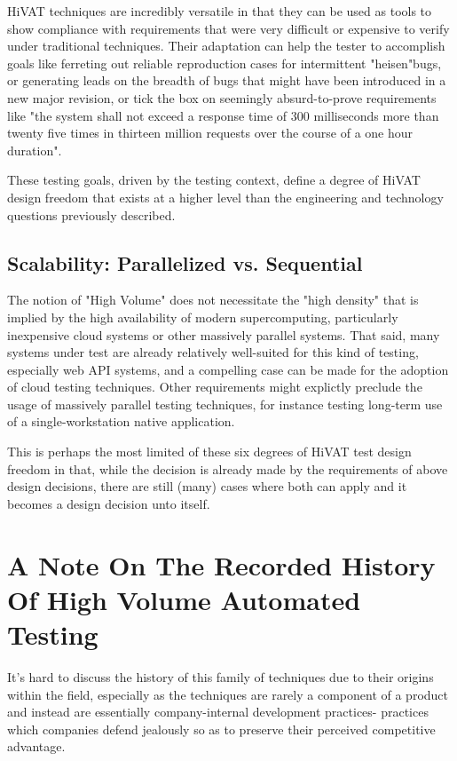 HiVAT techniques are incredibly versatile in that they can be used as tools to show compliance with requirements that were very difficult or expensive to verify under traditional techniques. Their adaptation can help the tester to accomplish goals like ferreting out reliable reproduction cases for intermittent "heisen"bugs, or generating leads on the breadth of bugs that might have been introduced in a new major revision, or tick the box on seemingly absurd-to-prove requirements like "the system shall not exceed a response time of 300 milliseconds more than twenty five times in thirteen million requests over the course of a one hour duration".

These testing goals, driven by the testing context, define a degree of HiVAT design freedom that exists at a higher level than the engineering and technology questions previously described.

\subsection{Scalability: Parallelized vs. Sequential}
The notion of "High Volume" does not necessitate the "high density" that is implied by the high availability of modern supercomputing, particularly inexpensive cloud systems or other massively parallel systems. That said, many systems under test are already relatively well-suited for this kind of testing, especially web API systems, and a compelling case can be made for the adoption of cloud testing techniques.\citep{parveen2010migrate} Other requirements might explictly preclude the usage of massively parallel testing techniques, for instance testing long-term use of a single-workstation native application.

This is perhaps the most limited of these six degrees of HiVAT test design freedom in that, while the decision is already made by the requirements of above design decisions, there are still (many) cases where both can apply and it becomes a design decision unto itself.

\section{A Note On The Recorded History Of High Volume Automated Testing}
It's hard to discuss the history of this family of techniques due to their origins within the field, especially as the techniques are rarely a component of a product and instead are essentially company-internal development practices- practices which companies defend jealously so as to preserve their perceived competitive advantage.

